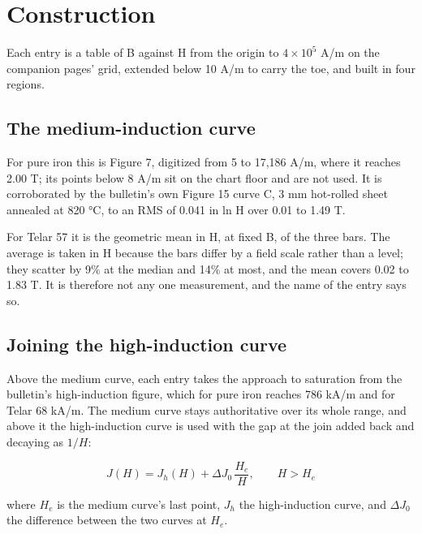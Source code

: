 \documentclass[
  11pt,
]{article}
\begin{document}
\section{Construction}\label{construction}

Each entry is a table of B against H from the origin to \(4\times10^{5}\) A/m on the companion pages' grid, extended below 10 A/m to carry the toe, and built in four regions.

\subsection{The medium-induction curve}\label{the-medium-induction-curve}

For pure iron this is Figure 7, digitized from 5 to 17,186 A/m, where it reaches 2.00 T; its points below 8 A/m sit on the chart floor and are not used. It is corroborated by the bulletin's own Figure 15 curve C, 3 mm hot-rolled sheet annealed at 820 °C, to an RMS of 0.041 in ln H over 0.01 to 1.49 T.

For Telar 57 it is the geometric mean in H, at fixed B, of the three bars. The average is taken in H because the bars differ by a field scale rather than a level; they scatter by 9\% at the median and 14\% at most, and the mean covers 0.02 to 1.83 T. It is therefore not any one measurement, and the name of the entry says so.

\subsection{Joining the high-induction curve}\label{joining-the-high-induction-curve}

Above the medium curve, each entry takes the approach to saturation from the bulletin's high-induction figure, which for pure iron reaches 786 kA/m and for Telar 68 kA/m. The medium curve stays authoritative over its whole range, and above it the high-induction curve is used with the gap at the join added back and decaying as \(1/H\):

\begin{equation}\label{eq:join}
J(H) = J_h(H) + \Delta J_0\,\frac{H_e}{H}, \qquad H > H_e
\end{equation}

where \(H_e\) is the medium curve's last point, \(J_h\) the high-induction curve, and \(\Delta J_0\) the difference between the two curves at \(H_e\).
\end{document}
